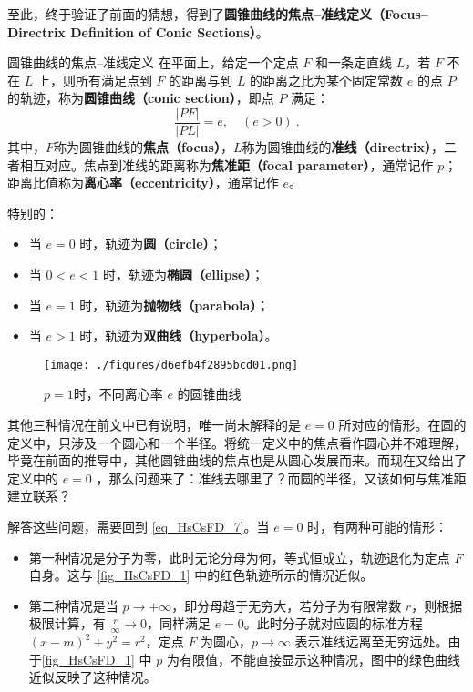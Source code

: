 至此，终于验证了前面的猜想，得到了\textbf{圆锥曲线的焦点–准线定义（Focus–Directrix Definition of Conic Sections）}。

\begin{definition}{圆锥曲线的焦点–准线定义}\label{def_HsCsFD_1}
在平面上，给定一个定点 $F$ 和一条定直线 $L$，若 $F$ 不在 $L$ 上，则所有满足点到 $F$ 的距离与到 $L$ 的距离之比为某个固定常数 $e$ 的点 $P$ 的轨迹，称为\textbf{圆锥曲线（conic section）}，即点 $P$ 满足：
\begin{equation}
\frac{|PF|}{|PL|} = e,\quad(e>0)~.
\end{equation}
其中，$F$称为圆锥曲线的\textbf{焦点（focus）}，$L$称为圆锥曲线的\textbf{准线（directrix）}，二者相互对应。焦点到准线的距离称为\textbf{焦准距（focal parameter）}，通常记作 $p$；距离比值称为\textbf{离心率（eccentricity）}，通常记作 $e$。

特别的：
\begin{itemize}
\item 当 $e = 0$ 时，轨迹为\textbf{圆（circle）}；
\item 当 $0 < e < 1$ 时，轨迹为\textbf{椭圆（ellipse）}；
\item 当 $e = 1$ 时，轨迹为\textbf{抛物线（parabola）}；
\item 当 $e > 1$ 时，轨迹为\textbf{双曲线（hyperbola）}。
\end{itemize}
\end{definition}

\begin{figure}[ht]
\centering
\texttt{[image: ./figures/d6efb4f2895bcd01.png]}
\caption{$p = 1$时，不同离心率 $e$ 的圆锥曲线} \label{fig_HsCsFD_1}
\end{figure}

其他三种情况在前文中已有说明，唯一尚未解释的是 $e = 0$ 所对应的情形。在圆的定义中，只涉及一个圆心和一个半径。将统一定义中的焦点看作圆心并不难理解，毕竟在前面的推导中，其他圆锥曲线的焦点也是从圆心发展而来。而现在又给出了定义中的 $e = 0$ ，那么问题来了：准线去哪里了？而圆的半径，又该如何与焦准距建立联系？

解答这些问题，需要回到 \autoref{eq_HsCsFD_7}。当 $e = 0$ 时，有两种可能的情形：
\begin{itemize}
\item 第一种情况是分子为零，此时无论分母为何，等式恒成立，轨迹退化为定点 $F$ 自身。这与 \autoref{fig_HsCsFD_1} 中的红色轨迹所示的情况近似。
\item 第二种情况是当 $p \to +\infty$，即分母趋于无穷大，若分子为有限常数 $r$，则根据极限计算，有 $\displaystyle\frac{r}{\infty} \to 0$，同样满足 $e = 0$。此时分子就对应圆的标准方程 $(x - m)^2 + y^2 = r^2$，定点 $F$ 为圆心，$p \to \infty$ 表示准线远离至无穷远处。由于\autoref{fig_HsCsFD_1} 中 $p$ 为有限值，不能直接显示这种情况，图中的绿色曲线近似反映了这种情况。
\end{itemize}

